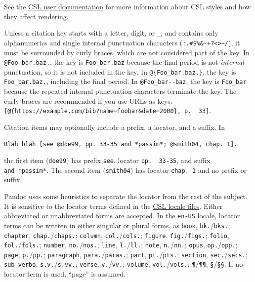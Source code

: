 \documentclass[
  b5paper
]{book}
\begin{document}
See the \href{https://citationstyles.org/authors/}{CSL user
documentation} for more information about CSL styles and how they affect
rendering.

Unless a citation key starts with a letter, digit, or \texttt{\_}, and
contains only alphanumerics and single internal punctuation characters
(\texttt{:.\#\$\%\&-+?\textless{}\textgreater{}\textasciitilde{}/}), it
must be surrounded by curly braces, which are not considered part of the
key. In \texttt{@Foo\_bar.baz.}, the key is \texttt{Foo\_bar.baz}
because the final period is not \emph{internal} punctuation, so it is
not included in the key. In \texttt{@\{Foo\_bar.baz.\}}, the key is
\texttt{Foo\_bar.baz.}, including the final period. In
\texttt{@Foo\_bar-\/-baz}, the key is \texttt{Foo\_bar} because the
repeated internal punctuation characters terminate the key. The curly
braces are recommended if you use URLs as keys:
\texttt{{[}@\{https://example.com/bib?name=foobar\&date=2000\},\ p.\ \ 33{]}}.

Citation items may optionally include a prefix, a locator, and a suffix.
In

\begin{verbatim}
Blah blah [see @doe99, pp. 33-35 and *passim*; @smith04, chap. 1].
\end{verbatim}

the first item (\texttt{doe99}) has prefix \texttt{see}, locator
\texttt{pp.\ \ 33-35}, and suffix \texttt{and\ *passim*}. The second
item (\texttt{smith04}) has locator \texttt{chap.\ 1} and no prefix or
suffix.

Pandoc uses some heuristics to separate the locator from the rest of the
subject. It is sensitive to the locator terms defined in the
\href{https://github.com/citation-style-language/locales}{CSL locale
files}. Either abbreviated or unabbreviated forms are accepted. In the
\texttt{en-US} locale, locator terms can be written in either singular
or plural forms, as \texttt{book}, \texttt{bk.}/\texttt{bks.};
\texttt{chapter}, \texttt{chap.}/\texttt{chaps.}; \texttt{column},
\texttt{col.}/\texttt{cols.}; \texttt{figure},
\texttt{fig.}/\texttt{figs.}; \texttt{folio},
\texttt{fol.}/\texttt{fols.}; \texttt{number},
\texttt{no.}/\texttt{nos.}; \texttt{line}, \texttt{l.}/\texttt{ll.};
\texttt{note}, \texttt{n.}/\texttt{nn.}; \texttt{opus},
\texttt{op.}/\texttt{opp.}; \texttt{page}, \texttt{p.}/\texttt{pp.};
\texttt{paragraph}, \texttt{para.}/\texttt{paras.}; \texttt{part},
\texttt{pt.}/\texttt{pts.}; \texttt{section},
\texttt{sec.}/\texttt{secs.}; \texttt{sub\ verbo},
\texttt{s.v.}/\texttt{s.vv.}; \texttt{verse}, \texttt{v.}/\texttt{vv.};
\texttt{volume}, \texttt{vol.}/\texttt{vols.}; \texttt{¶}/\texttt{¶¶};
\texttt{§}/\texttt{§§}. If no locator term is used, ``page'' is assumed.
\end{document}
